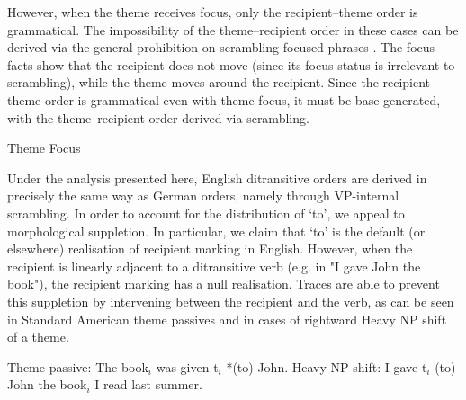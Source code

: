 However, when the theme receives focus, only the recipient--theme order is grammatical. The impossibility of the theme--recipient order in these cases can be derived via the general prohibition on scrambling focused phrases \citep{Choi.1996}. The focus facts show that the recipient does not move (since its focus status is irrelevant to scrambling), while the theme moves around the recipient. Since the recipient--theme order is grammatical even with theme focus, it must be base generated, with the theme--recipient order derived via scrambling.

\begin{exe}
\ex\label{ex:gerfocus} Theme Focus \citep[ex 13]{Choi.1996}
\begin{xlist}
\end{xlist}
\end{exe}

Under the analysis presented here, English ditransitive orders are derived in precisely the same way as German orders, namely through VP-internal scrambling. In order to account for the distribution of `to', we appeal to morphological suppletion. In particular, we claim that `to' is the default (or elsewhere) realisation of recipient marking in English. However, when the recipient is linearly adjacent to a ditransitive verb (e.g. in "I gave John the book"), the recipient marking has a null realisation. Traces are able to prevent this suppletion by intervening between the recipient and the verb, as can be seen in Standard American theme passives and in cases of rightward Heavy NP shift of a theme.

\begin{exe}
\ex Theme passive: The book$_i$ was given t$_i$ *(to) John.
\ex Heavy NP shift: I gave t$_i$ (to) John the book$_i$ I read last summer.
\end{exe}

